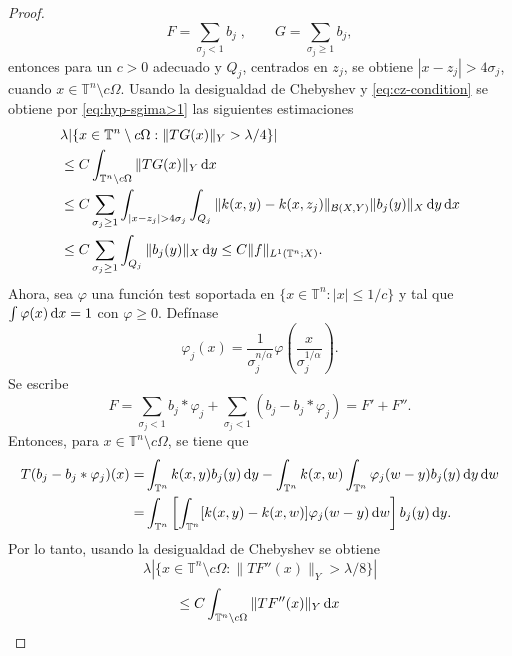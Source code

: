 \begin{proof}
\begin{equation*}
		F = \sum_{\sigma_j < 1} b_j\;, \quad  \quad G = \sum_{\sigma_j \geq 1}b_j,
	\end{equation*}
	entonces para un $c>0$ adecuado y $Q_j$, centrados en $z_j$, se obtiene $|x - z_j| > 4\sigma_j$, cuando $x \in \mathbb{T}^n \setminus c\Omega$. Usando la desigualdad de Chebyshev y \cref{eq:cz-condition} se obtiene por \cref{eq:hyp-sgima>1} las siguientes estimaciones
	\begin{align*}
		 & \lambda|\{ x \in \mathbb{T}^n \setminus c\Omega : \|TG(x)\|_Y > \lambda/4 \}| \\
		 &\leq C \int_{\mathbb{T}^n \setminus c\Omega} \|TG(x)\|_Y \diff x \\
		 &\leq
		C\sum_{\sigma_j \geq 1} \int_{|x-z_j|>4\sigma_j} \int_{Q_j} \|k(x, y) - k(x, z_j)\|_{\mathcal{B}(X, Y)}\|b_j(y)\|_X \diff y \diff x \\
		 &\leq C\sum_{\sigma_j \geq 1} \int_{Q_j}\|b_j(y)\|_X \diff y \leq C\|f\|_{L^1(\mathbb{T}^n; X)}.
	\end{align*}
	Ahora, sea $\varphi$ una función test soportada en $\{x \in \mathbb{T}^n : |x| \leq 1/c\}$ y tal que $\int\varphi(x) \mathop{}\!\mathrm{d} x = 1$ con $\varphi \geq 0$. Defínase
	\begin{equation*}
		\varphi_j(x) = \frac{1}{\sigma_j^{n/\alpha}} \varphi\left( \frac{x}{\sigma_j^{1/\alpha}} \right).
	\end{equation*}
	Se escribe
	\begin{equation*}
		F = \sum_{\sigma_j < 1}b_j *\varphi_j + \sum_{\sigma_j<1}(b_j - b_j * \varphi_j) = F' + F'' .
	\end{equation*}
	Entonces, para $x \in\mathbb{T}^n \setminus c\Omega $, se tiene que
	\begin{align*}
		T(b_j - b_j * \varphi_j)(x) = & \int_{\mathbb{T}^n}k(x, y)b_j(y)\mathop{}\!\mathrm{d} y - \int_{\mathbb{T}^n}k(x, w) \int_{\mathbb{T}^n} \varphi_j(w-y)b_j(y)\mathop{}\!\mathrm{d} y \mathop{}\!\mathrm{d} w \\
		= & \int_{\mathbb{T}^n}\left[\int_{\mathbb{T}^n}[k(x, y) - k(x, w)]\varphi_j(w-y)\mathop{}\!\mathrm{d} w\right] b_j(y)\mathop{}\!\mathrm{d} y.
	\end{align*}
	Por lo tanto, usando la desigualdad de Chebyshev se obtiene
	\begin{equation}
		\lambda |\{x \in \mathbb{T}^n \setminus c\Omega : \|TF''(x)\|_Y > \lambda/8\}|
		\label{eq:TF''}
	\end{equation}
	\begin{equation*}
		\leq  C\int_{\mathbb{T}^n \setminus c\Omega}\|TF''(x)\|_Y \mathop{}\!\mathrm{d} x
	\end{equation*}
	\begin{equation*}

\end{equation*}
\end{proof}
